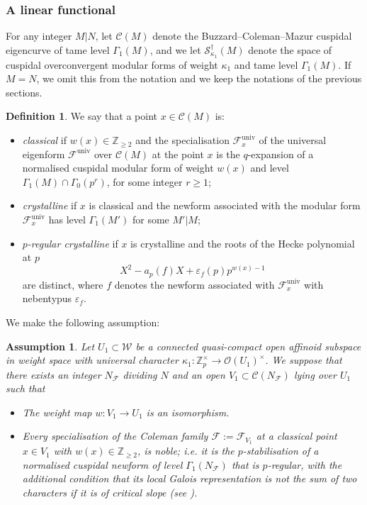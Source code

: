 \documentclass[10pt, oneside]{amsart}
\numberwithin{equation}{subsection}
\newtheorem{assumption}[equation]{Assumption}
\theoremstyle{definition}
\newtheorem{definition}[equation]{Definition}
\theoremstyle{remark}
\newcommand{\mbb}[1]{\mathbb{#1}}
\newcommand{\opn}[1]{\operatorname{#1}}
\begin{document}
\subsubsection{A linear functional} \label{ALinearFunctionalSection}

For any integer $M | N$, let $\mathcal{C}(M)$ denote the Buzzard--Coleman--Mazur cuspidal eigencurve of tame level $\Gamma_1(M)$, and we let $\mathscr{S}^{\dagger}_{\kappa_1}(M)$ denote the space of cuspidal overconvergent modular forms of weight $\kappa_1$ and tame level $\Gamma_1(M)$. If $M=N$, we omit this from the notation and we keep the notations of the previous sections.

\begin{definition} \label{ClassicalPregDef}
    We say that a point $x \in \mathcal{C}(M)$ is:
    \begin{itemize}
        \item \emph{classical} if $w(x) \in \mbb{Z}_{\geq 2}$ and the specialisation $\mathcal{F}^{\opn{univ}}_x$ of the universal eigenform $\mathcal{F}^{\opn{univ}}$ over $\mathcal{C}(M)$ at the point $x$ is the $q$-expansion of a normalised cuspidal modular form of weight $w(x)$ and level $\Gamma_1(M) \cap \Gamma_0(p^r)$, for some integer $r \geq 1$;
        \item \emph{crystalline} if $x$ is classical and the newform associated with the modular form $\mathcal{F}^{\opn{univ}}_x$ has level $\Gamma_1(M')$ for some $M' | M$;
        \item \emph{$p$-regular crystalline} if $x$ is crystalline and the roots of the Hecke polynomial at $p$
        \[
        X^2 - a_p(f)X + \varepsilon_f(p)p^{w(x)-1}
        \]
        are distinct, where $f$ denotes the newform associated with $\mathcal{F}^{\opn{univ}}_x$ with nebentypus $\varepsilon_f$.
    \end{itemize}
\end{definition}

We make the following assumption:

\begin{assumption} \label{NobleAssumption}
Let $U_1 \subset \mathcal{W}$ be a connected quasi-compact open affinoid subspace in weight space with universal character $\kappa_1 \colon \mbb{Z}_p^{\times} \to \mathcal{O}(U_1)^{\times}$. We suppose that there exists an integer $N_{\mathcal{F}}$ dividing $N$ and an open $V_1 \subset \mathcal{C}(N_{\mathcal{F}})$ lying over $U_1$ such that
\begin{itemize}
    \item The weight map $w \colon V_1 \to U_1$ is an isomorphism.
    \item Every specialisation of the Coleman family $\mathcal{F} := \mathcal{F}_{V_1}$ at a classical point $x \in V_1$ with $w(x) \in \mbb{Z}_{\geq 2}$, is \emph{noble}; i.e. it is the $p$-stabilisation of a normalised cuspidal newform of level $\Gamma_1(N_{\mathcal{F}})$ that is $p$-regular, with the additional condition that its local Galois representation is not the sum of two characters if it is of critical slope (see \cite[Definition 4.6.3]{LZ16Coleman}).
\end{itemize}
\end{assumption}
\end{document}
